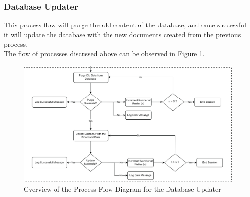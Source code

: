 \subsubsection{Database Updater}
\label{subsubsec:db_updater}
This process flow will purge the old content of 
the database, and once successful it will update the database with the 
new documents created from the previous process.
\hfill \\

The flow of processes discussed above can be observed 
in Figure \ref{fig:process_flowchart_db_updater}.

\begin{figure}[ht]
    \centering
    \includegraphics[width=1\textwidth]{./assets/ProcessFlowchart-04.png}
    \caption{Overview of the Process Flow Diagram for the Database Updater}
    \label{fig:process_flowchart_db_updater}
\end{figure}
\FloatBarrier